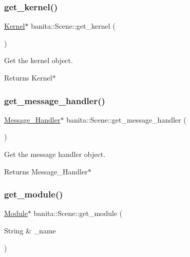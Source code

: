 \subsubsection{\texorpdfstring{get\_kernel()}{get\_kernel()}}
{\footnotesize\ttfamily \mbox{\hyperlink{classbanita_1_1_kernel}{Kernel}}$\ast$ banita\+::\+Scene\+::get\+\_\+kernel (\begin{DoxyParamCaption}{ }\end{DoxyParamCaption})\hspace{0.3cm}{\ttfamily [inline]}}



Get the kernel object. 

\begin{DoxyReturn}{Returns}
Kernel$\ast$ 
\end{DoxyReturn}
\mbox{\label{classbanita_1_1_scene_ab95cc89547ab5d33414a7743bfe9f60f}} 
\subsubsection{\texorpdfstring{get\_message\_handler()}{get\_message\_handler()}}
{\footnotesize\ttfamily \mbox{\hyperlink{classbanita_1_1_message___handler}{Message\+\_\+\+Handler}}$\ast$ banita\+::\+Scene\+::get\+\_\+message\+\_\+handler (\begin{DoxyParamCaption}{ }\end{DoxyParamCaption})\hspace{0.3cm}{\ttfamily [inline]}}



Get the message handler object. 

\begin{DoxyReturn}{Returns}
Message\+\_\+\+Handler$\ast$ 
\end{DoxyReturn}
\mbox{\label{classbanita_1_1_scene_a6c535a65a7fcd80bf6d1d04a59b056cb}} 
\subsubsection{\texorpdfstring{get\_module()}{get\_module()}}
{\footnotesize\ttfamily \mbox{\hyperlink{classbanita_1_1_module}{Module}}$\ast$ banita\+::\+Scene\+::get\+\_\+module (\begin{DoxyParamCaption}\item[{String \&}]{\+\_\+name }\end{DoxyParamCaption})\hspace{0.3cm}{\ttfamily [inline]}}



